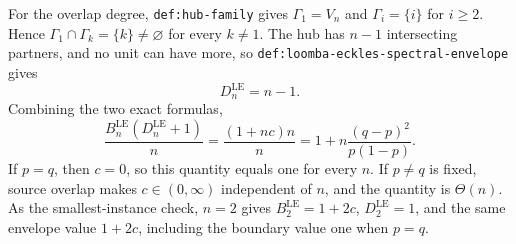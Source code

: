 For the overlap degree, \texttt{def:hub-family} gives \(\Gamma_1=V_n\) and \(\Gamma_i=\{i\}\) for \(i\ge2\).  Hence \(\Gamma_1\cap\Gamma_k=\{k\}\ne\varnothing\) for every \(k\ne1\).  The hub has \(n-1\) intersecting partners, and no unit can have more, so \texttt{def:loomba-eckles-spectral-envelope} gives
\[
 D_n^{\mathrm{LE}}=n-1.
\]
Combining the two exact formulas,
\[
 \frac{B_n^{\mathrm{LE}}(D_n^{\mathrm{LE}}+1)}{n}
 =\frac{(1+nc)n}{n}
 =1+n\frac{(q-p)^2}{p(1-p)}.
\]
If \(p=q\), then \(c=0\), so this quantity equals one for every \(n\).  If \(p\ne q\) is fixed, source overlap makes \(c\in(0,\infty)\) independent of \(n\), and the quantity is \(\Theta(n)\).  As the smallest-instance check, \(n=2\) gives \(B_2^{\mathrm{LE}}=1+2c\), \(D_2^{\mathrm{LE}}=1\), and the same envelope value \(1+2c\), including the boundary value one when \(p=q\).